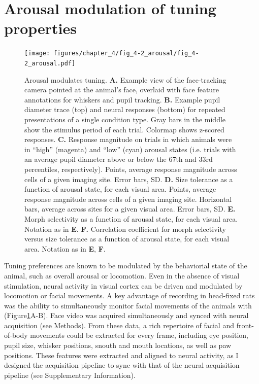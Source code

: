 \section{Arousal modulation of tuning properties} 
\begin{figure}[t!]
    \texttt{[image: figures/chapter\_4/fig\_4-2\_arousal/fig\_4-2\_arousal.pdf]}
    \caption[Arousal modulates tuning]{Arousal modulates tuning. 
    \textbf{A.} Example view of the face-tracking camera pointed at the animal’s face, overlaid with face feature annotations for whiskers and pupil tracking.
    \textbf{B.} Example pupil diameter trace (top) and neural responses (bottom) for repeated presentations of a single condition type. Gray bars in the middle show the stimulus period of each trial. Colormap shows z-scored responses.
    \textbf{C.} Response magnitude on trials in which animals were in “high” (magenta) and “low” (cyan) arousal states (i.e. trials with an average pupil diameter above or below the 67th and 33rd percentiles, respectively). Points, average response magnitude across cells of a given imaging site. Error bars, SD.
    \textbf{D.} Size tolerance as a function of arousal state, for each visual area. Points, average response magnitude across cells of a given imaging site. Horizontal bars, average across sites for a given visual area. Error bars, SD.
    \textbf{E.} Morph selectivity as a function of arousal state, for each visual area. Notation as in \textbf{E}.
    \textbf{F.} Correlation coefficient for morph selectivity versus size tolerance as a function of arousal state, for each visual area. Notation as in \textbf{E}, \textbf{F}.
    \label{fig:arousal}}
\end{figure}

Tuning preferences are known to be modulated by the behaviorial state of the animal, such as overall arousal or locomotion\cite{Niell2010,Saleem2013,Vinck2015, Dadarlat2017}. Even in the absence of visual stimulation, neural activity in visual cortex can be driven and modulated by locomotion or facial movements\cite{Keller2012SensorimotorMouse, Stringer2019a}. A key advantage of recording in head-fixed rats was the ability to simultaneously monitor facial movements of the animals with (Figure\ref{fig:arousal}A-B). Face video was acquired simultaneously and synced with neural acquisition (see Methods). From these data, a rich repertoire of facial and front-of-body movements could be extracted for every frame, including eye position, pupil size, whisker positions, snouth and mouth locations, as well as paw positions. These features were extracted\cite{Mathis2018, Nath2019} and aligned to neural activity, as I designed the acquisition pipeline to sync with that of the neural acquisition pipeline (see Supplementary Information).

